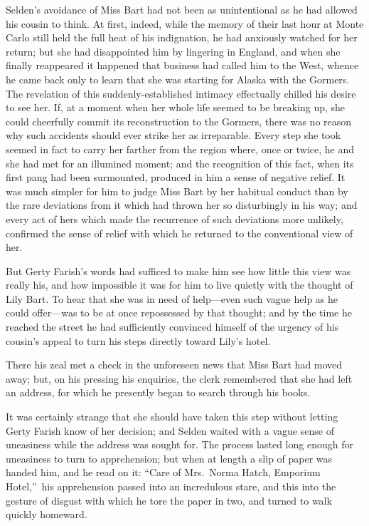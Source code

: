\documentclass[12pt,a4paper]{book}
\begin{document}
Selden's avoidance of Miss Bart had not been as unintentional as
he had allowed his cousin to think. At first, indeed, while the
memory of their last hour at Monte Carlo still held the full heat
of his indignation, he had anxiously watched for her return; but
she had disappointed him by lingering in England, and when she
finally reappeared it happened that business had called him to the
West, whence he came back only to learn that she was starting for
Alaska with the Gormers. The revelation of this suddenly-established
intimacy effectually chilled his desire to see her. If, at a
moment when her whole life seemed to be breaking up, she could
cheerfully commit its reconstruction to the Gormers, there was no
reason why such accidents should ever strike her as irreparable. 
Every step she took seemed in fact to carry her farther from the
region where, once or twice, he and she had met for an illumined
moment; and the recognition of this fact, when its first pang had
been surmounted, produced in him a sense of negative relief. It was
much simpler for him to judge Miss Bart by her habitual conduct
than by the rare deviations from it which had thrown her so
disturbingly in his way; and every act of hers which made the
recurrence of such deviations more unlikely, confirmed the sense
of relief with which he returned to the conventional view of her.





But Gerty Farish's words had sufficed to make him see how
little this view was really his, and how impossible it was for
him to live quietly with the thought of Lily Bart. To hear that
she was in need of help---even such vague help as he could
offer---was to be at once repossessed by that thought; and by the
time he reached the street he had sufficiently convinced himself
of the urgency of his cousin's appeal to turn his steps directly
toward Lily's hotel.





There his zeal met a check in the unforeseen news that Miss Bart
had moved away; but, on his pressing his enquiries, the clerk
remembered that she had left an address, for which he presently
began to search through his books.





It was certainly strange that she should have taken this step
without letting Gerty Farish know of her decision; and Selden
waited with a vague sense of uneasiness while the address was
sought for. The process lasted long enough for uneasiness to turn
to apprehension; but when at length a slip of paper was handed
him, and he read on it: ``Care of Mrs.\ Norma Hatch, Emporium
Hotel,''\ his apprehension passed into an incredulous stare, and
this into the gesture of disgust with which he tore the paper in
two, and turned to walk quickly homeward.
\end{document}
